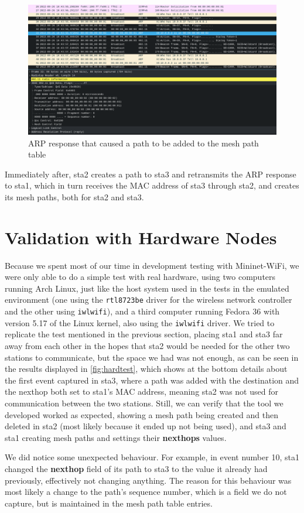 \begin{figure}[htb]
   \centering
   \includegraphics[scale=.35]{capsta3}
   \caption{\ac{ARP} response that caused a path to be added to the mesh path table}\label{fig:capsta3}
\end{figure}

Immediately after, sta2 creates a path to sta3 and retransmits the \ac{ARP}
response to sta1, which in turn receives the \ac{MAC} address of sta3 through
sta2, and creates its mesh paths, both for sta2 and sta3.


\section{Validation with Hardware Nodes}\label{sect:valid}

Because we spent most of our time in development testing with Mininet-WiFi, we
were only able to do a simple test with real hardware, using two computers
running Arch Linux, just like the host system used in the tests in the emulated
environment (one using the \texttt{rtl8723be} driver for the wireless network
controller and the other using \texttt{iwlwifi}), and a third computer running
Fedora 36 with version 5.17 of the Linux kernel, also using the \texttt{iwlwifi}
driver. We tried to replicate the test mentioned in the previous section,
placing sta1 and sta3 far away from each other in the hopes that sta2 would be
needed for the other two stations to communicate, but the space we had was not
enough, as can be seen in the results displayed in \autoref{fig:hardtest}, which
shows at the bottom details about the first event captured in sta3, where a path
was added with the destination and the nexthop both set to sta1's \ac{MAC}
address, meaning sta2 was not used for communication between the two stations.
Still, we can verify that the tool we developed worked as expected, showing a
mesh path being created and then deleted in sta2 (most likely because it ended
up not being used), and sta3 and sta1 creating mesh paths and settings their
\textbf{nexthops} values.

We did notice some unexpected behaviour. For example, in event number 10, sta1
changed the \textbf{nexthop} field of its path to sta3 to the value it already
had previously, effectively not changing anything. The reason for this behaviour
was most likely a change to the path's sequence number, which is a field we do
not capture, but is maintained in the mesh path table entries.
